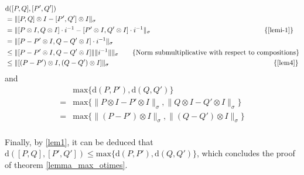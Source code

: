 \begin{equation} \label{eq:proof_theorem1.1_esq}
  \begin{split}
    & \text{d} ([P,Q],[P',Q'])  \\
    &=  \lVert  [P,Q] \otimes I - [P',Q'] \otimes I   \rVert_{\sigma}  \\
    &=   \lVert [P \otimes I, Q \otimes I] \cdot i^{-1}  - [P' \otimes I, Q' \otimes I]  \cdot i^{-1}  \rVert_{\sigma}   \hspace{165pt}  \text{\{\autoref{lemi-1}\}} \\
    &=  \lVert [P - P' \otimes I, Q-Q' \otimes I] \cdot i^{-1}  \rVert_{\sigma}   \\
    & \leq \lVert [P - P' \otimes I, Q-Q' \otimes I]  \rVert \lVert i^{-1}  \rVert \rVert_{\sigma} \hspace{20pt} \text{\{Norm submultiplicative with respect to compositions\}}  \\  
    & \leq \lVert [(P - P') \otimes I, (Q-Q') \otimes I]  \rVert_{\sigma} \hspace{235pt} \text{ \{\autoref{lem4}\}} \\
  \end{split}
  \end{equation}
and
\begin{equation} \label {eq:proof_theorem1.1_dir}
\begin{split}
   &  \text{max} \{\text{d} (P,P'),\text{d} (Q,Q')\} \\
   = &  \text{max}\{ \lVert P \otimes I - P' \otimes I \rVert_{\sigma}, \lVert Q \otimes I - Q'\otimes I \rVert_{\sigma} \}\\
   = &  \text{max}\{ \lVert (P - P') \otimes I \rVert_{\sigma}, \lVert (Q - Q') \otimes I \rVert_{\sigma} \}\\
\end{split}
\end{equation}

Finally, by  \autoref{lem1}, it can be deduced that $\text{d} ([P,Q],[P',Q']) \leq \text{max} \{\text{d} (P,P'),\text{d} (Q,Q')\}$, which concludes the proof of theorem \autoref{lemma_max_otimes}.
\vspace{10pt}


